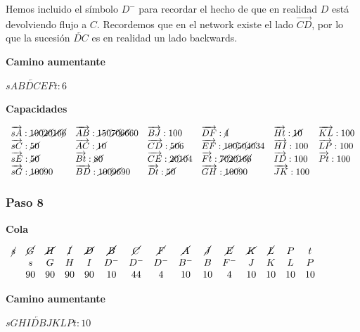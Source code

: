 \documentclass[10pt,a4paper]{article}
\begin{document}
Hemos incluido el símbolo $D^-$ para recordar el hecho de que en realidad $D$ está devolviendo flujo a $C$. Recordemos que en el network existe el lado $\overrightarrow{CD}$, por lo que la sucesión $\overleftarrow{DC}$ es en realidad un lado backwards.

\textbf{Camino aumentante}

\textbf{$sAB\overleftarrow{DC}EFt:6$}

\textbf{Capacidades}

$\begin{array}{llllll} \overrightarrow{sA}: \cancel{100}\cancel{20}\cancel{16}\cancel{6}& \overrightarrow{AB}: \cancel{150} \cancel{70}\cancel{66}60&\overrightarrow{BJ}: 100&\overrightarrow{DF}: \cancel{4}&\overrightarrow{Ht}: \cancel{10}&\overrightarrow{KL}: 100\\ \overrightarrow{sC}: \cancel{50}& \overrightarrow{AC}: \cancel{10}&\overrightarrow{CD}: \cancel{50}6&\overrightarrow{EF}: \cancel{100}\cancel{50}\cancel{40}34&\overrightarrow{HI}: 100&\overrightarrow{LP}: 100\\ \overrightarrow{sE}: \cancel{50}& \overrightarrow{Bt}: \cancel{80}&\overrightarrow{CE}: \cancel{20}\cancel{10}4 &\overrightarrow{Ft}: \cancel{70}\cancel{20}\cancel{16}\cancel{6}&\overrightarrow{ID}: 100&\overrightarrow{Pt}: 100\\ \overrightarrow{sG}: \cancel{100}90& \overrightarrow{BD}: \cancel{100}\cancel{96}90&\overrightarrow{Dt}: \cancel{50}&\overrightarrow{GH}: \cancel{100}90&\overrightarrow{JK}: 100&\\ \end{array}$

\subsubsection*{Paso 8}

\textbf{Cola}

$\begin{array}{ccccccccccccccc} \cancel{s} & \cancel{G} & \cancel{H} & \cancel{I} & \cancel{D} & \cancel{B} &\cancel{C} & \cancel{F} &\cancel{A} & \cancel{J} &\cancel{E} & \cancel{K}& \cancel{L} &P & t\\ &s & G &H & I & D^- &D^- & D^- & B^- &B & F^-&J & K & L& P\\ & 90 & 90& 90 & 90 & 10 & 44 & 4&10 &10 & 4 & 10 & 10 & 10 & 10 \end{array}$

\textbf{Camino aumentante}

\textbf{$sGHI\overleftarrow{DB}JKLPt:10$}
\end{document}
